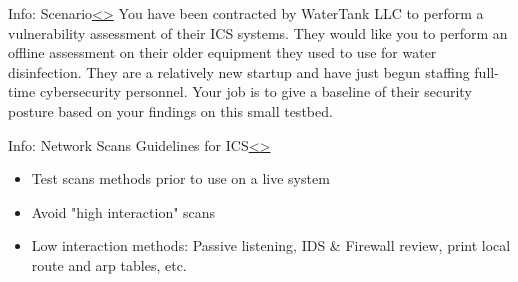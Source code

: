 \documentclass[12pt]{extarticle}
\newenvironment{instructionblock}{\Large\bgroup}{\egroup}
\newcommand{\bi}{\begin{itemize}}
\newcommand{\ei}{\end{itemize}}
\newcounter{next}
\newcounter{prev}
\begin{document}


\pagebreak
{}
\begin{slide}{Info: Scenario}{\hyperref[slide \theprev]{\textless}\hyperref[slide \thenext]{\textgreater}}
	\begin{instructionblock}
		You have been contracted by WaterTank LLC to perform a vulnerability assessment of their ICS systems. They would like you to perform an offline assessment on their older equipment they used to use for water disinfection. They are a relatively new startup and have just begun staffing full-time cybersecurity personnel. Your job is to give a baseline of their security posture based on your findings on this small testbed.
	\end{instructionblock}
\end{slide}
\vfill
\noindent
\pagebreak


\pagebreak
{}
\begin{slide}{Info: Network Scans Guidelines for ICS}{\hyperref[slide \theprev]{\textless}\hyperref[slide \thenext]{\textgreater}}
	\begin{instructionblock}
		\bi
		\item Test scans methods prior to use on a live system
		\item Avoid "high interaction" scans
		\item Low interaction methods: Passive listening, IDS \& Firewall review, print local route and arp tables, etc.
		\ei
	\end{instructionblock}
\end{slide}
\vfill
\noindent
\pagebreak

\end{document}
